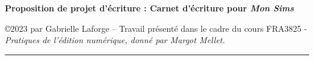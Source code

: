 \documentclass[10pt,french,letterpaper]{article}
\subtitle{Carnet d'écriture pour \emph{Mon Sims}}
\author{Gabrielle  Laforge }
\date{}
\begin{document}
\noindent{}
\hfill\llap{
  \footnotesize{}
  }
\noindent{}
\hfill\llap{
  \footnotesize{}
  }
\noindent\rlap{
    \large\textbf{}
    }
\hfill{}

\vspace*{0.4cm}
\color{black}\raggedright \Large{\textbf{Proposition de projet
d'écriture : Carnet d'écriture pour \emph{Mon Sims}}}

\vspace*{0.4cm}
\footnotesize{\copyright 2023 par Gabrielle  Laforge  --
Travail présenté dans le cadre du cours FRA3825 - \em Pratiques de
l'édition numérique, 
 \normalfont donné par Margot Mellet.}
\color{TealBlue}\hrule
\color{black}\vspace*{0.4cm}
\end{document}
